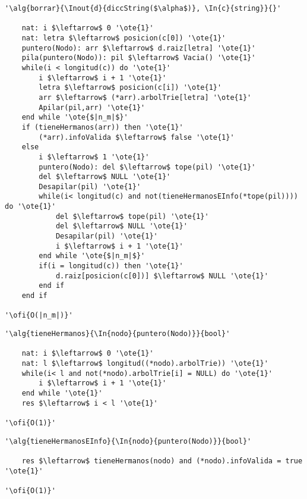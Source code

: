 \begin{lstlisting}[mathescape]
'\alg{borrar}{\Inout{d}{diccString($\alpha$)}, \In{c}{string}}{}'

	nat: i $\leftarrow$ 0 '\ote{1}'
	nat: letra $\leftarrow$ posicion(c[0]) '\ote{1}'
	puntero(Nodo): arr $\leftarrow$ d.raiz[letra] '\ote{1}'
	pila(puntero(Nodo)): pil $\leftarrow$ Vacia() '\ote{1}'
	while(i < longitud(c)) do '\ote{1}'
		i $\leftarrow$ i + 1 '\ote{1}'
		letra $\leftarrow$ posicion(c[i]) '\ote{1}'
		arr $\leftarrow$ (*arr).arbolTrie[letra] '\ote{1}'
		Apilar(pil,arr) '\ote{1}'
	end while '\ote{$|n_m|$}'
	if (tieneHermanos(arr)) then '\ote{1}'
		(*arr).infoValida $\leftarrow$ false '\ote{1}'
	else
		i $\leftarrow$ 1 '\ote{1}'
		puntero(Nodo): del $\leftarrow$ tope(pil) '\ote{1}'
		del $\leftarrow$ NULL '\ote{1}'
		Desapilar(pil) '\ote{1}'
		while(i< longitud(c) and not(tieneHermanosEInfo(*tope(pil)))) do '\ote{1}'
			del $\leftarrow$ tope(pil) '\ote{1}'
			del $\leftarrow$ NULL '\ote{1}'
			Desapilar(pil) '\ote{1}'
			i $\leftarrow$ i + 1 '\ote{1}'
		end while '\ote{$|n_m|$}'
		if(i = longitud(c)) then '\ote{1}'
			d.raiz[posicion(c[0])] $\leftarrow$ NULL '\ote{1}'
		end if
	end if

'\ofi{O(|n_m|)}'

\end{lstlisting}

\begin{lstlisting}[mathescape]
'\alg{tieneHermanos}{\In{nodo}{puntero(Nodo)}}{bool}'

	nat: i $\leftarrow$ 0 '\ote{1}'
	nat: l $\leftarrow$ longitud((*nodo).arbolTrie)) '\ote{1}'
	while(i< l and not(*nodo).arbolTrie[i] = NULL) do '\ote{1}'
		i $\leftarrow$ i + 1 '\ote{1}'
	end while '\ote{1}' 
	res $\leftarrow$ i < l '\ote{1}'

'\ofi{O(1)}'

\end{lstlisting}

\begin{lstlisting}[mathescape]
'\alg{tieneHermanosEInfo}{\In{nodo}{puntero(Nodo)}}{bool}'

	res $\leftarrow$ tieneHermanos(nodo) and (*nodo).infoValida = true '\ote{1}'

'\ofi{O(1)}'

\end{lstlisting}


